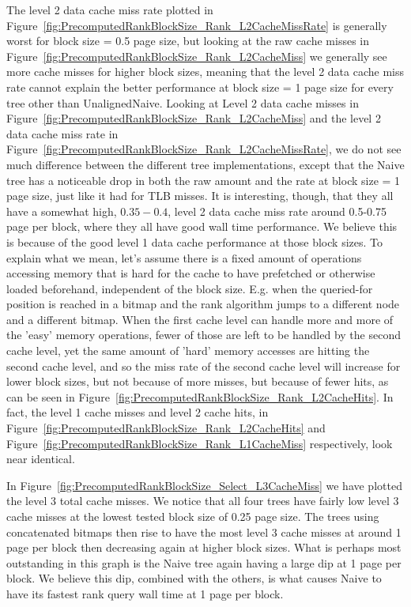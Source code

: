 The level 2 data cache miss rate plotted in Figure~\ref{fig:PrecomputedRankBlockSize_Rank_L2CacheMissRate} is generally worst for block size = 0.5 page size, but looking at the raw cache misses in Figure~\ref{fig:PrecomputedRankBlockSize_Rank_L2CacheMiss} we generally see more cache misses for higher block sizes, meaning that the level 2 data cache miss rate cannot explain the better performance at block size = 1 page size for every tree other than UnalignedNaive.
Looking at Level 2 data cache misses in Figure~\ref{fig:PrecomputedRankBlockSize_Rank_L2CacheMiss} and the level 2 data cache miss rate in Figure~\ref{fig:PrecomputedRankBlockSize_Rank_L2CacheMissRate}, we do not see much difference between the different tree implementations, except that the Naive tree has a noticeable drop in both the raw amount and the rate at block size = 1 page size, just like it had for TLB misses.
It is interesting, though, that they all have a somewhat high, $0.35-0.4$, level 2 data cache miss rate around 0.5-0.75 page per block, where they all have good wall time performance.
We believe this is because of the good level 1 data cache performance at those block sizes.
To explain what we mean, let's assume there is a fixed amount of operations accessing memory that is hard for the cache to have prefetched or otherwise loaded beforehand, independent of the block size.
E.g. when the queried-for position is reached in a bitmap and the rank algorithm jumps to a different node and a different bitmap.
When the first cache level can handle more and more of the 'easy' memory operations, fewer of those are left to be handled by the second cache level, yet the same amount of 'hard' memory accesses are hitting the second cache level, and so the miss rate of the second cache level will increase for lower block sizes, but not because of more misses, but because of fewer hits, as can be seen in Figure~\ref{fig:PrecomputedRankBlockSize_Rank_L2CacheHits}.
In fact, the level 1 cache misses and level 2 cache hits, in Figure~\ref{fig:PrecomputedRankBlockSize_Rank_L2CacheHits} and Figure~\ref{fig:PrecomputedRankBlockSize_Rank_L1CacheMiss} respectively, look near identical.

In Figure~\ref{fig:PrecomputedRankBlockSize_Select_L3CacheMiss} we have plotted the level 3 total cache misses.
We notice that all four trees have fairly low level 3 cache misses at the lowest tested block size of 0.25 page size.
The trees using concatenated bitmaps then rise to have the most level 3 cache misses at around 1 page per block then decreasing again at higher block sizes.
What is perhaps most outstanding in this graph is the Naive tree again having a large dip at 1 page per block.
We believe this dip, combined with the others, is what causes Naive to have its fastest rank query wall time at 1 page per block.


